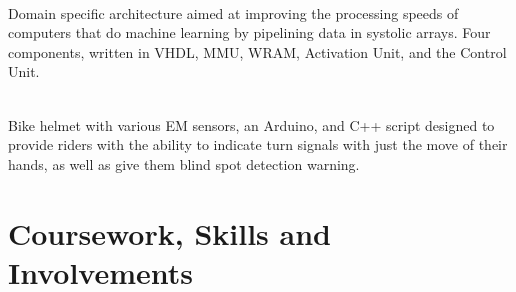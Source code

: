 \documentclass[]{rj-res}
\begin{document}
\begin{minipage}[t]{1\textwidth}
 \\
Domain specific architecture aimed at improving the processing speeds of computers that do machine learning by pipelining data in systolic arrays.
Four components, written in VHDL, MMU, WRAM, Activation Unit, and the Control Unit.
\sectionsep

 \\
Bike helmet with various EM sensors, an Arduino, and C++ script designed to provide riders with the ability to indicate turn signals with just the move of their hands, as well as give them blind spot detection warning.
\sectionsep 

\end{minipage}
\section{Coursework, Skills and Involvements} 
\end{document}
